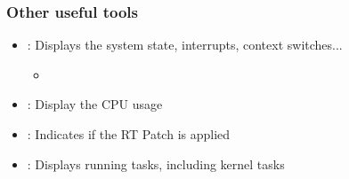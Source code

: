 \begin{frame}
	\frametitle{Other useful tools}
	\begin{itemize}
		\item {}: Displays the system state, interrupts, context switches...
			\begin{itemize}
				\item {}
			\end{itemize}
		\item {}: Display the CPU usage
		\item {}: Indicates if the RT Patch is applied
		\item {}: Displays running tasks, including kernel tasks
	\end{itemize}
\end{frame}

